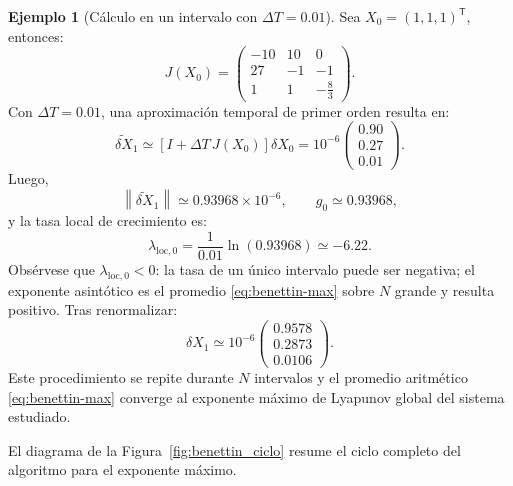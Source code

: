\documentclass[12pt,a4paper,oneside]{report}
\theoremstyle{definition}
\newtheorem{ejemplo}{Ejemplo}[chapter]
\numberwithin{equation}{chapter}
\newcommand{\norm}[1]{\left\lVert #1\right\rVert}
\newcommand{\trans}{\mathsf{T}}
\begin{document}
\begin{ejemplo}[Cálculo en un intervalo con $\Delta T = 0.01$]
\label{ej:benettin-intervalo}
Sea \(X_0=(1,1,1)^{\trans}\), entonces:
\begin{equation}
    J(X_0)=
    \begin{pmatrix}
        -10&10&0\\
        27&-1&-1\\
        1&1&-\frac83
    \end{pmatrix}.
\end{equation}
Con \(\Delta T=0.01\), una aproximación temporal de primer orden resulta en:
\begin{equation}
    \widetilde{\delta X}_1 \simeq \left[I+\Delta T\,J(X_0)\right]\delta X_0 = 10^{-6}
    \begin{pmatrix}
        0.90\\0.27\\0.01
    \end{pmatrix}.
\end{equation}
Luego,
\begin{equation}
    \norm{\widetilde{\delta X}_1} \simeq0.93968\times10^{-6}, \qquad g_0\simeq0.93968,
\end{equation}
y la tasa local de crecimiento es:
\begin{equation}
    \lambda_{\mathrm{loc},0} = \frac{1}{0.01}\ln(0.93968) \simeq-6.22.
\end{equation}
Obsérvese que \(\lambda_{\mathrm{loc},0}<0\): la tasa de un único
intervalo puede ser negativa; el exponente asintótico es el promedio
\eqref{eq:benettin-max} sobre \(N\) grande y resulta positivo.
Tras renormalizar:
\begin{equation}
    \delta X_1 \simeq10^{-6}
    \begin{pmatrix}
        0.9578\\0.2873\\0.0106
    \end{pmatrix}.
\end{equation}
Este procedimiento se repite durante \(N\) intervalos y el promedio
aritmético \eqref{eq:benettin-max} converge al exponente máximo de
Lyapunov global del sistema estudiado.
\end{ejemplo}
El diagrama de la Figura~\ref{fig:benettin_ciclo} resume el ciclo
completo del algoritmo para el exponente máximo.
\end{document}

